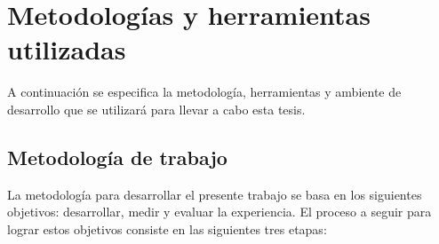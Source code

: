 \section{Metodologías y herramientas utilizadas}

A continuación se especifica la metodología, herramientas y ambiente de desarrollo que se utilizará para llevar a cabo esta tesis.

\subsection{Metodología de trabajo}

La metodología para desarrollar el presente trabajo se basa en los siguientes objetivos: desarrollar, medir y evaluar la experiencia. El proceso a seguir para lograr estos objetivos consiste en las siguientes tres etapas:


